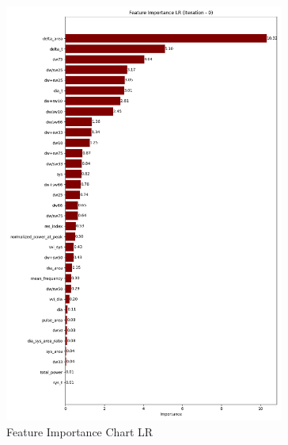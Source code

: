 \begin{figure}[b!]
    \centering
    \hspace{-2cm}
    \includegraphics[width=0.82\textwidth]{images/results/feature_importance/feature_importance_plot_LR_0}
    \caption{Feature Importance Chart LR}
    \label{fig:fi_lr}
\end{figure}

